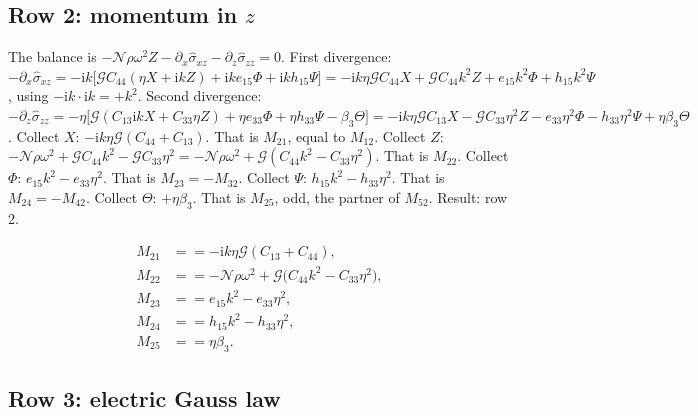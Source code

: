 \documentclass[11pt]{article}
\makeatletter
\newif\ifshowworked
\newenvironment{worked}{%
  \ifshowworked\par\smallskip\noindent\textit{Working.}\par\smallskip\else
  \setbox\z@\vbox\bgroup\fi}{\ifshowworked\par\smallskip\else\egroup\fi}
\newcommand{\ii}{\mathrm{i}}
\newcommand{\Ncal}{\mathcal{N}}
\newcommand{\Gcal}{\mathcal{G}}
\makeatother
\begin{document}
\subsection*{Row 2: momentum in $z$}

\begin{worked}
The balance is $-\Ncal\rho\omega^2Z-\partial_x\hat\sigma_{xz}-\partial_z\hat\sigma_{zz}=0$.
First divergence: $-\partial_x\hat\sigma_{xz}
=-\ii k\bigl[\Gcal C_{44}(\eta X+\ii kZ)+\ii ke_{15}\Phi+\ii kh_{15}\Psi\bigr]
=-\ii k\eta\Gcal C_{44}X+\Gcal C_{44}k^2Z+e_{15}k^2\Phi+h_{15}k^2\Psi$,
using $-\ii k\cdot\ii k=+k^2$.
Second divergence: $-\partial_z\hat\sigma_{zz}
=-\eta\bigl[\Gcal(C_{13}\ii kX+C_{33}\eta Z)+\eta e_{33}\Phi+\eta h_{33}\Psi-\beta_3\Theta\bigr]
=-\ii k\eta\Gcal C_{13}X-\Gcal C_{33}\eta^2Z-e_{33}\eta^2\Phi-h_{33}\eta^2\Psi+\eta\beta_3\Theta$.
Collect $X$: $-\ii k\eta\Gcal(C_{44}+C_{13})$. That is $M_{21}$, equal to $M_{12}$.
Collect $Z$: $-\Ncal\rho\omega^2+\Gcal C_{44}k^2-\Gcal C_{33}\eta^2
=-\Ncal\rho\omega^2+\Gcal(C_{44}k^2-C_{33}\eta^2)$. That is $M_{22}$.
Collect $\Phi$: $e_{15}k^2-e_{33}\eta^2$. That is $M_{23}=-M_{32}$.
Collect $\Psi$: $h_{15}k^2-h_{33}\eta^2$. That is $M_{24}=-M_{42}$.
Collect $\Theta$: $+\eta\beta_3$. That is $M_{25}$, odd, the partner of $M_{52}$.
Result: row 2.
\end{worked}

\begin{align}
M_{21}&==-\ii k\eta\Gcal(C_{13}+C_{44}), \\
M_{22}&==-\Ncal\rho\omega^2+\Gcal\bigl(C_{44}k^2-C_{33}\eta^2\bigr), \\
M_{23}&==e_{15}k^2-e_{33}\eta^2, \\
M_{24}&==h_{15}k^2-h_{33}\eta^2, \\
M_{25}&==\eta\beta_3 .
\end{align}

\subsection*{Row 3: electric Gauss law}
\end{document}
